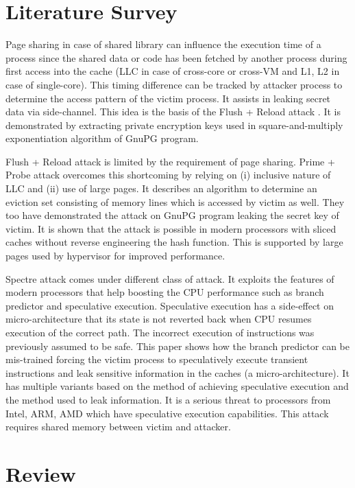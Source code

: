 \documentclass[a4paper,12pt, final]{report}
\begin{document}
\chapter{Literature Survey}
Page sharing in case of shared library can influence the execution time of a process since the shared data or code has been fetched by another process during first access into the cache (LLC in case of cross-core or cross-VM and L1, L2 in case of single-core). This timing difference can be tracked by attacker process to determine the access pattern of the victim process. It assists in leaking secret data via side-channel. This idea is the basis of the Flush + Reload attack \cite{flush_reload}. It is demonstrated by extracting private encryption keys used in square-and-multiply exponentiation algorithm of GnuPG program.

Flush + Reload attack is limited by the requirement of page sharing. Prime + Probe attack \cite{prime_probe_llc} overcomes this shortcoming by relying on (i) inclusive nature of LLC and (ii) use of large pages. It describes an algorithm to determine an eviction set consisting of memory lines which is accessed by victim as well. They too have demonstrated the attack on GnuPG program leaking the secret key of victim. It is shown that the attack is possible in modern processors with sliced caches without reverse engineering the hash function. This is supported by large pages used by hypervisor for improved performance.

Spectre attack \cite{spectre} comes under different class of attack. It exploits the features of modern processors that help boosting the CPU performance such as branch predictor and speculative execution. Speculative execution has a side-effect on micro-architecture that its state is not reverted back when CPU resumes execution of the correct path. The incorrect execution of instructions was previously assumed to be safe. This paper shows how the branch predictor can be mis-trained forcing the victim process to speculatively execute transient instructions and leak sensitive information in the caches (a micro-architecture). It has multiple variants based on the method of achieving speculative execution and the method used to leak information. It is a serious threat to processors from Intel, ARM, AMD which have speculative execution capabilities. This attack requires shared memory between victim and attacker.

\chapter{Review}
\end{document}
